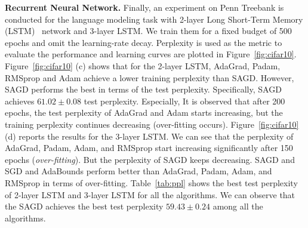 \documentclass[11pt]{article}
\begin{document}

\textbf{Recurrent Neural Network.}
Finally, an experiment on Penn Treebank is conducted for the language modeling task with 2-layer Long Short-Term Memory (LSTM)~\citep{stni2018} network and 3-layer LSTM. We train them for a fixed budget of 500 epochs and omit the learning-rate decay. Perplexity is used as the metric to evaluate the performance and learning curves are plotted in Figure~\ref{fig:cifar10}. 
Figure~\ref{fig:cifar10} (c) shows that for the 2-layer LSTM, AdaGrad, Padam, RMSprop and Adam achieve a lower training perplexity than \textsc{SAGD}. However, \textsc{SAGD} performs the best in terms of the test perplexity. Specifically, \textsc{SAGD} achieves $61.02 \pm 0.08$ test perplexity. 
Especially, It is observed that after 200 epochs, the test perplexity of AdaGrad and Adam starts increasing, but the training perplexity continues decreasing (over-fitting occurs).  
Figure~\ref{fig:cifar10} (d) reports the results for the 3-layer LSTM. We can see that the perplexity of AdaGrad, Padam, Adam, and RMSprop start increasing significantly after 150 epochs (\emph{over-fitting}). But the perplexity of \textsc{SAGD} keeps decreasing. \textsc{SAGD} and SGD and AdaBounds perform better than AdaGrad, Padam, Adam, and RMSprop in terms of over-fitting.
Table~\ref{tab:ppl} shows the best test perplexity of 2-layer LSTM and 3-layer LSTM for all the algorithms. We can observe that the \textsc{SAGD} achieves the best test perplexity $59.43 \pm 0.24$ among all the algorithms. 
\end{document}
